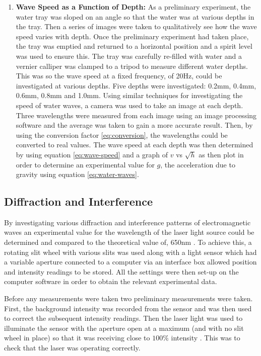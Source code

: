 \documentclass{article}
\begin{document}
\begin{enumerate}
  \item \textbf{Wave Speed as a Function of Depth:} As a preliminary experiment, the water tray was sloped on an angle so that the water was at various depths in the tray. Then a series of images were taken to qualitatively see how the wave speed varies with depth. Once the preliminary experiment had taken place, the tray was emptied and returned to a horizontal position and a spirit level was used to ensure this. The tray was carefully re-filled with water and a vernier calliper was clamped to a tripod to measure different water depths. This was so the wave speed at a fixed frequency, of 20Hz, could be investigated at various depths. Five depths were investigated: 0.2mm, 0.4mm, 0.6mm, 0.8mm and 1.0mm. Using similar techniques for investigating the speed of water waves, a camera was used to take an image at each depth. Three wavelengths were measured from each image using an image processing software and the average was taken to gain a more accurate result. Then, by using the conversion factor \eqref{eq:conversion}, the wavelengths could be converted to real values. The wave speed at each depth was then determined by using equation \eqref{eq:wave-speed} and a graph of $v$ vs $\sqrt{h}$ as then plot in order to determine an experimental value for $g$, the acceleration due to gravity using equation \eqref{eq:water-waves}.
\end{enumerate}

\subsection{Diffraction and Interference}
\label{ssec:diffraction-method}

By investigating various diffraction and interference patterns of electromagnetic waves an experimental value for the wavelength of the laser light source could be determined and compared to the theoretical value of, 650nm \cite{Paper02}. To achieve this, a rotating slit wheel with various slits was used along with a light sensor which had a variable aperture connected to a computer via an interface box allowed position and intensity readings to be stored. All the settings were then set-up on the computer software in order to obtain the relevant experimental data. 

\vspace{2mm}
\noindent
Before any measurements were taken two preliminary measurements were taken. First, the background intensity was recorded from the sensor and was then used to correct the subsequent intensity readings. Then the laser light was used to illuminate the sensor with the aperture open at a maximum (and with no slit wheel in place) so that it was receiving close to $100\%$ intensity \cite{Paper01}. This was to check that the laser was operating correctly.
\end{document}
